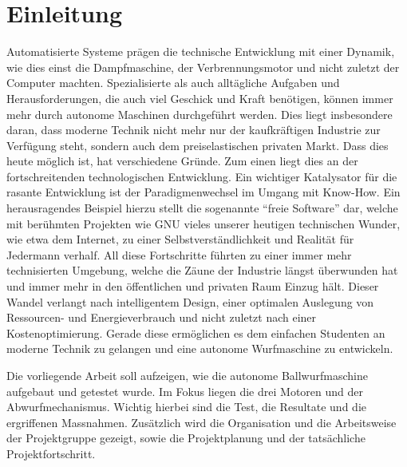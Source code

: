\section{Einleitung}

Automatisierte Systeme prägen die technische Entwicklung mit einer Dynamik,
wie dies einst die Dampfmaschine, der Verbrennungsmotor und nicht zuletzt der
Computer machten. Spezialisierte als auch alltägliche Aufgaben und 
Herausforderungen, die auch viel Geschick und Kraft benötigen, können immer
mehr durch autonome Maschinen durchgeführt werden. Dies liegt insbesondere
daran, dass moderne Technik nicht mehr nur der kaufkräftigen Industrie zur
Verfügung steht, sondern auch dem preiselastischen privaten Markt. Dass dies
heute möglich ist, hat verschiedene Gründe. Zum einen liegt dies an der
fortschreitenden technologischen Entwicklung. Ein wichtiger Katalysator für
die rasante Entwicklung ist der Paradigmenwechsel im Umgang mit Know-How.
Ein herausragendes Beispiel hierzu stellt die sogenannte 
``freie Software'' dar, welche mit berühmten Projekten wie GNU vieles
unserer heutigen technischen Wunder, wie etwa dem Internet, zu einer
Selbstverständlichkeit und Realität für Jedermann verhalf.
All diese Fortschritte führten zu einer immer mehr technisierten
Umgebung, welche die Zäune der Industrie längst überwunden hat und immer
mehr in den öffentlichen und privaten Raum Einzug hält. Dieser Wandel
verlangt nach intelligentem Design, einer optimalen Auslegung von
Ressourcen- und Energieverbrauch und nicht zuletzt nach einer
Kostenoptimierung. Gerade diese ermöglichen es dem einfachen Studenten an
moderne Technik zu gelangen und eine autonome Wurfmaschine zu
entwickeln. 

Die vorliegende Arbeit soll aufzeigen, wie die autonome Ballwurfmaschine aufgebaut und getestet wurde.
Im Fokus liegen die drei Motoren und der Abwurfmechanismus.
Wichtig hierbei sind die Test, die Resultate und die ergriffenen Massnahmen.
Zusätzlich wird die Organisation und die Arbeitsweise der Projektgruppe gezeigt,
sowie die Projektplanung und der tatsächliche Projektfortschritt.
